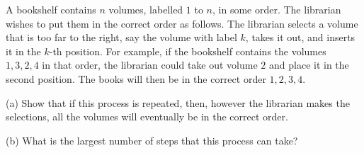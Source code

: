 A bookshelf contains $n$ volumes, labelled $1$ to $n$,  in some order. The librarian wishes to put them in the correct order as follows. The librarian selects a volume that is too far to the right, say the volume with label $k$,  takes it out, and inserts it in the $k$-th position. For example, if the bookshelf contains the volumes $1,3,2,4$ in that order, the librarian could take out volume $2$ and place it in the second position. The books will then be in the correct order $1,2,3,4$.

(a) Show that if this process is repeated, then, however the librarian makes the selections, all the volumes will eventually be in the correct order.

(b) What is the largest number of steps that this process can take?